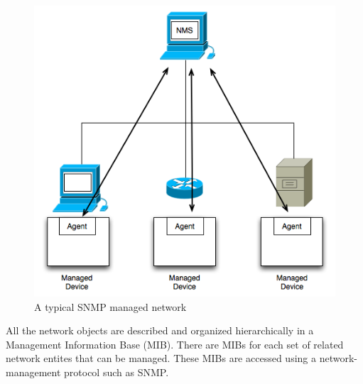 \begin{figure}[H]
\centering
	\includegraphics[width=.7\linewidth]{Pictures/Chapter3/snmp.png}
	\caption{A typical SNMP managed network}
\end{figure}

All the network objects are described and organized hierarchically in a Management Information Base (MIB). There are MIBs for each set of related network entites that can be managed. These MIBs are accessed using a network-management protocol such as SNMP.




